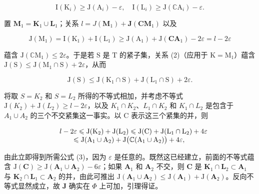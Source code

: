 \[
\mathrm{I} \left(\mathrm{K} _ {i}\right) \geqslant \mathrm{J} \left(\mathrm{A} _ {i}\right) - \varepsilon , \quad \mathrm{I} \left(\mathrm{L} _ {i}\right) \geqslant \mathrm{J} \left(\mathbb {C} \mathrm{A} _ {i}\right) - \varepsilon .
\]

置 \(\mathbf{M}_1 = \mathbf{K}_1\cup \mathbf{L}_1\)；关系 \(l = J(\mathbf{M}_1) + \mathbf{J}(\mathbf{C}\mathbf{M}_1)\) 以及

\[
\mathrm{J} \left(\mathrm{M} _ {1}\right) = \mathrm{I} \left(\mathrm{K} _ {1}\right) + \mathrm{I} \left(\mathrm{L} _ {1}\right) \geqslant \mathrm{J} \left(\mathrm{A} _ {1}\right) + \mathrm{J} \left(\mathbf {C A} _ {1}\right) - 2 \varepsilon = l - 2 \varepsilon
\]

蕴含 \(\mathrm{J}(\mathbb{C}\mathrm{M}_1) \leqslant 2\varepsilon\)。于是若 \(\mathrm{S}\) 是 \(\mathrm{T}\) 的紧子集，关系 (2)（应用于 \(\mathrm{K} = \mathrm{M}_1\)）蕴含 \(\mathrm{J}(\mathrm{S}) \leqslant \mathrm{J}(\mathrm{M}_1 \cap \mathrm{S}) + 2\varepsilon\)，从而

\[
\mathrm{J} (\mathrm{S}) \leqslant \mathrm{J} (\mathrm{K} _ {1} \cap \mathrm{S}) + \mathrm{J} (\mathrm{L} _ {1} \cap \mathrm{S}) + 2 \varepsilon .
\]

将取 \(S = K_{2}\) 和 \(S = L_{2}\) 所得的不等式相加，并考虑不等式 \(\mathrm{J}(K_{2}) + \mathrm{J}(L_{2}) \geqslant l - 2\varepsilon\)，以及 \(K_{1} \cap K_{2}\)、\(L_{1} \cap K_{2}\) 和 \(K_{1} \cap L_{2}\) 是包含于 \(A_{1} \cup A_{2}\) 的三个不交紧集这一事实。以 C 表示这三个紧集的并，则

\[
\begin{array}{r l} & {l - 2 \varepsilon \leqslant \mathrm{J} (\mathrm{K} _ {2}) + \mathrm{J} (\mathrm{L} _ {2}) \leqslant \mathrm{J} (\mathrm{C}) + \mathrm{J} (\mathrm{L} _ {1} \cap \mathrm{L} _ {2}) + 4 \varepsilon} \\ & {\qquad \leqslant \mathrm{J} (\mathrm{A} _ {1} \cup \mathrm{A} _ {2}) + \mathrm{J} \big (\mathbb {C} (\mathrm{A} _ {1} \cup \mathrm{A} _ {2}) \big) + 4 \varepsilon ,} \end{array}
\]

由此立即得到所需公式 (3)，因为 \(\varepsilon\) 是任意的。既然这已经建立，前面的不等式蕴含 \(\mathrm{J}(\mathbf{C}) \geqslant \mathrm{J}(\mathbf{A}_1 \cup \mathbf{A}_2) - 6\varepsilon\)；如果 \(\mathbf{A}_1\) 和 \(\mathbf{A}_2\) 不交，则 \(\mathbf{C}\) 是 \(\mathbf{K}_1 \cap \mathbf{L}_2 \subset \mathbf{A}_1\) 与 \(\mathbf{K}_2 \cap \mathbf{L}_1 \subset \mathbf{A}_2\) 的并，由此可推出 \(\mathrm{J}(\mathbf{A}_1 \cup \mathbf{A}_2) \leqslant \mathrm{J}(\mathbf{A}_1) + \mathrm{J}(\mathbf{A}_2)\)。反向不等式显然成立，故 \(\mathbf{J}\) 确实在 \(\Phi\) 上可加，引理得证。

